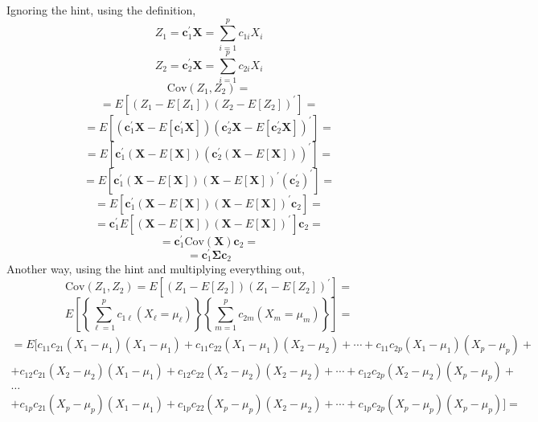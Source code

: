         Ignoring the hint, using the definition,
        \[
            Z_1 = \mathbf{c}_1^\prime\mathbf{X} = \sum_{i=1}^p{c_{1i}X_i}
        \]
        \[
            Z_2 = \mathbf{c}_2^\prime\mathbf{X} = \sum_{i=1}^p{c_{2i}X_i}
        \]
        \[
            \text{Cov}\left(Z_1, Z_2\right)
            =
        \]
        \[
            =
            E\left[\left(Z_1 - E\left[Z_1\right]\right){\left(Z_2 - E\left[Z_2\right]\right)}^\prime\right]
            =
        \]
        \[
            =
            E\left[\left(\mathbf{c}_1^\prime\mathbf{X} - E\left[\mathbf{c}_1^\prime\mathbf{X}\right]\right){\left(\mathbf{c}_2^\prime\mathbf{X} - E\left[\mathbf{c}_2^\prime\mathbf{X}\right]\right)}^\prime\right]
            =
        \]
        \[
            =
            E\left[\mathbf{c}_1^\prime\left(\mathbf{X} - E\left[\mathbf{X}\right]\right){\left(\mathbf{c}_2^\prime\left(\mathbf{X} - E\left[\mathbf{X}\right]\right)\right)}^\prime\right]
            =
        \]
        \[
            =
            E\left[\mathbf{c}_1^\prime\left(\mathbf{X} - E\left[\mathbf{X}\right]\right){\left(\mathbf{X} - E\left[\mathbf{X}\right]\right)}^\prime\left(\mathbf{c}_2^\prime\right)^\prime\right]
            =
        \]
        \[
            =
            E\left[\mathbf{c}_1^\prime\left(\mathbf{X} - E\left[\mathbf{X}\right]\right){\left(\mathbf{X} - E\left[\mathbf{X}\right]\right)}^\prime\mathbf{c}_2\right]
            =
        \]
        \[
            =
            \mathbf{c}_1^\prime E\left[\left(\mathbf{X} - E\left[\mathbf{X}\right]\right){\left(\mathbf{X} - E\left[\mathbf{X}\right]\right)}^\prime\right]\mathbf{c}_2
            =
        \]
        \[
            =
            \mathbf{c}_1^\prime \text{Cov}\left(\mathbf{X}\right)\mathbf{c}_2
            =
        \]
        \[
            =
            \mathbf{c}_1^\prime \mathbf{\Sigma}\mathbf{c}_2
        \]
        Another way, using the hint and multiplying everything out,
        \[
            \text{Cov}\left(Z_1, Z_2\right)
            =
            E\left[\left(Z_1 - E[Z_2]\right){\left(Z_1 - E[Z_2]\right)}^\prime\right]
            =
        \]
        \[
            E\left[\left\{\sum_{\ell=1}^{p}c_{1\ell}\left(X_\ell=\mu_\ell\right)\right\}\left\{\sum_{m=1}^{p}c_{2m}\left(X_m=\mu_m\right)\right\}\right]
            =
        \]
        \begin{multline*}
            =
            E[c_{11}c_{21}(X_1 - \mu_1)(X_1 - \mu_1) + c_{11}c_{22}(X_1 - \mu_1)(X_2 - \mu_2) +
            \cdots + c_{11}c_{2p}(X_1 - \mu_1)(X_p - \mu_p) + \\
            +c_{12}c_{21}(X_2 - \mu_2)(X_1 - \mu_1) + c_{12}c_{22}(X_2 - \mu_2)(X_2 - \mu_2) +
            \cdots + c_{12}c_{2p}(X_2 - \mu_2)(X_p - \mu_p) + \\
            \dots \\
            +c_{1p}c_{21}(X_p - \mu_p)(X_1 - \mu_1) + c_{1p}c_{22}(X_p - \mu_p)(X_2 - \mu_2) +
            \cdots + c_{1p}c_{2p}(X_p - \mu_p)(X_p - \mu_p)
            ] =
        \end{multline*}
